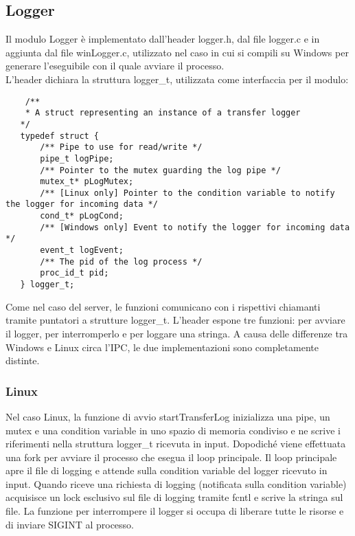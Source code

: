 \documentclass{article}
\begin{document}
\subsection{Logger}
Il modulo Logger è implementato dall'header logger.h, dal file logger.c e in aggiunta dal file winLogger.c,
utilizzato nel caso in cui si compili su Windows per generare l'eseguibile con il quale avviare il processo.\\
L'header dichiara la struttura logger\_t, utilizzata come interfaccia per il modulo:
\begin{lstlisting}
    /**
    * A struct representing an instance of a transfer logger
   */
   typedef struct {
       /** Pipe to use for read/write */
       pipe_t logPipe;
       /** Pointer to the mutex guarding the log pipe */
       mutex_t* pLogMutex;
       /** [Linux only] Pointer to the condition variable to notify the logger for incoming data */
       cond_t* pLogCond;
       /** [Windows only] Event to notify the logger for incoming data */
       event_t logEvent;
       /** The pid of the log process */
       proc_id_t pid;
   } logger_t;
\end{lstlisting}
Come nel caso del server, le funzioni comunicano con i rispettivi chiamanti tramite puntatori a 
strutture logger\_t.
L'header espone tre funzioni: per avviare il logger, per interromperlo e per loggare una stringa.
A causa delle differenze tra Windows e Linux circa l'IPC, le due implementazioni sono completamente distinte.

\subsubsection{Linux}
Nel caso Linux, la funzione di avvio startTransferLog inizializza una pipe, un mutex e una condition variable
in uno spazio di memoria condiviso e ne scrive i riferimenti nella struttura logger\_t ricevuta in input.
Dopodiché viene effettuata una fork per avviare il processo che esegua il loop principale.
Il loop principale apre il file di logging e attende sulla condition variable del logger ricevuto in input.
Quando riceve una richiesta di logging (notificata sulla condition variable) acquisisce un lock
esclusivo sul file di logging tramite fcntl e scrive la stringa sul file.
La funzione per interrompere il logger si occupa di liberare tutte le risorse e di inviare SIGINT
al processo.
\end{document}
